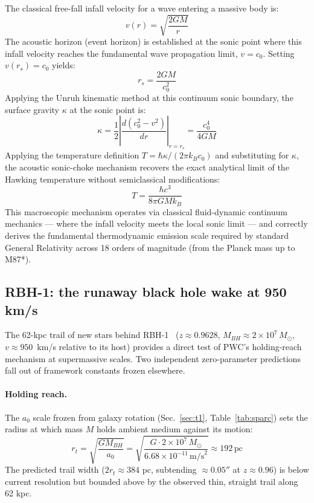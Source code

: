 \documentclass[aps,prd,twocolumn,superscriptaddress,amsmath,amssymb,nofootinbib,floatfix]{revtex4-2}
\newcommand{\Msun}{M_{\odot}}
\newcommand{\cnaught}{c_{0}}
\begin{document}
The classical free-fall infall velocity for a wave entering a massive body is:
\begin{equation}
v(r) = \sqrt{\frac{2GM}{r}}
\end{equation}
The acoustic horizon (event horizon) is established at the sonic point where this infall velocity reaches the fundamental wave propagation limit, $v = \cnaught$. Setting $v(r_s) = \cnaught$ yields:
\begin{equation}
r_s = \frac{2GM}{\cnaught^{2}}
\end{equation}
Applying the Unruh kinematic method at this continuum sonic boundary, the surface gravity $\kappa$ at the sonic point is:
\begin{equation}
\kappa = \frac{1}{2}\left|\frac{d(\cnaught^{2} - v^{2})}{dr}\right|_{r=r_s} = \frac{\cnaught^{4}}{4GM}
\end{equation}
Applying the temperature definition $T = \hbar\kappa/(2\pi k_B \cnaught)$ and substituting for $\kappa$, the acoustic sonic-choke mechanism recovers the exact analytical limit of the Hawking temperature without semiclassical modifications:
\begin{equation}
\boxed{T = \frac{\hbar c^{3}}{8\pi G M k_B}}
\end{equation}
This macroscopic mechanism operates via classical fluid-dynamic continuum mechanics --- where the infall velocity meets the local sonic limit --- and correctly derives the fundamental thermodynamic emission scale required by standard General Relativity across 18 orders of magnitude (from the Planck mass up to M87*).

\subsection{RBH-1: the runaway black hole wake at 950 km/s}
\label{ssec:rbh1}

The 62-kpc trail of new stars behind RBH-1~\cite{vanDokkum2023} ($z \approx 0.9628$, $M_{BH} \approx 2 \times 10^{7}\,\Msun$, $v \approx 950$~km/s relative to its host) provides a direct test of PWC's holding-reach mechanism at supermassive scales. Two independent zero-parameter predictions fall out of framework constants frozen elsewhere.

\paragraph*{Holding reach.}
The $a_0$ scale frozen from galaxy rotation (Sec.~\ref{sec:t1}, Table~\ref{tab:sparc}) sets the radius at which mass $M$ holds ambient medium against its motion:
\begin{equation}
r_t = \sqrt{\frac{G M_{BH}}{a_0}} = \sqrt{\frac{G \cdot 2 \times 10^{7}\,\Msun}{6.68 \times 10^{-11}\,\text{m/s}^2}} \approx 192\,\text{pc}
\end{equation}
The predicted trail width ($2 r_t \approx 384$ pc, subtending $\approx 0.05''$ at $z \approx 0.96$) is below current resolution but bounded above by the observed thin, straight trail along 62 kpc.
\end{document}
